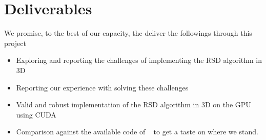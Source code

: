 \documentclass[12pt] {article}
\begin{document}
\section*{Deliverables}
We promise, to the best of our capacity, the deliver the followings through this project
\begin{itemize}
\item Exploring and reporting the challenges of implementing the RSD algorithm in 3D
\item Reporting our experience with solving these challenges 
\item Valid and robust implementation of the RSD algorithm in 3D on the GPU using CUDA
\item Comparison against the available code of ~\citep{cao2014gpu} to get a taste on where we stand. 
\end{itemize}




\end{document}
